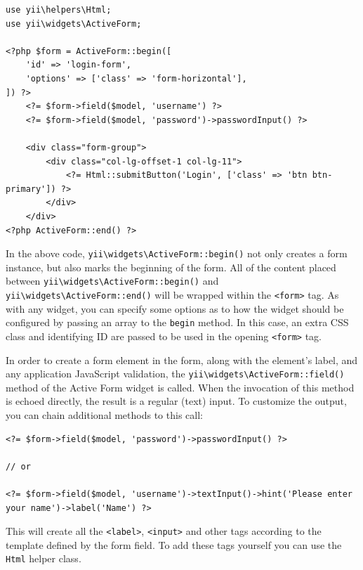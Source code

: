 \lstset{language=php}\begin{lstlisting}
use yii\helpers\Html;
use yii\widgets\ActiveForm;

<?php $form = ActiveForm::begin([
    'id' => 'login-form',
    'options' => ['class' => 'form-horizontal'],
]) ?>
    <?= $form->field($model, 'username') ?>
    <?= $form->field($model, 'password')->passwordInput() ?>

    <div class="form-group">
        <div class="col-lg-offset-1 col-lg-11">
            <?= Html::submitButton('Login', ['class' => 'btn btn-primary']) ?>
        </div>
    </div>
<?php ActiveForm::end() ?>
\end{lstlisting}
In the above code, \texttt{yii{\allowbreak{}\textbackslash}widgets{\allowbreak{}\textbackslash}ActiveForm\allowbreak{}::\allowbreak{}begin()} not only creates a form instance, but also marks the beginning of the form.
All of the content placed between \texttt{yii{\allowbreak{}\textbackslash}widgets{\allowbreak{}\textbackslash}ActiveForm\allowbreak{}::\allowbreak{}begin()} and
\texttt{yii{\allowbreak{}\textbackslash}widgets{\allowbreak{}\textbackslash}ActiveForm\allowbreak{}::\allowbreak{}end()} will be wrapped within the \lstinline|<form>| tag.
As with any widget, you can specify some options as to how the widget should be configured by passing an array to
the \lstinline|begin| method. In this case, an extra CSS class and identifying ID are passed to be used in the opening \lstinline|<form>| tag.

In order to create a form element in the form, along with the element's label, and any application JavaScript validation,
the \texttt{yii{\allowbreak{}\textbackslash}widgets{\allowbreak{}\textbackslash}ActiveForm\allowbreak{}::\allowbreak{}field()} method of the Active Form widget is called.
When the invocation of this method is echoed directly, the result is a regular (text) input.
To customize the output, you can chain additional methods to this call:

\lstset{language=php}\begin{lstlisting}
<?= $form->field($model, 'password')->passwordInput() ?>

// or

<?= $form->field($model, 'username')->textInput()->hint('Please enter your name')->label('Name') ?>
\end{lstlisting}
This will create all the \lstinline|<label>|, \lstinline|<input>| and other tags according to the template defined by the form field.
To add these tags yourself you can use the \lstinline|Html| helper class.

